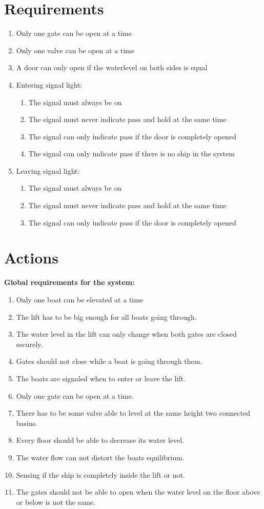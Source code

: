 \documentclass{article}
\begin{document}
\section{Requirements}
\begin{enumerate}
	\item Only one gate can be open at a time
	\item Only one valve can be open at a time
	\item A door can only open if the waterlevel on both sides is equal
	\item Entering signal light:
		\begin{enumerate}
			\item The signal must always be on
			\item The signal must never indicate pass and hold at the same time
			\item The signal can only indicate pass if the door is completely opened
			\item The signal can only indicate pass if there is no ship in the system
		\end{enumerate}
	\item Leaving signal light:
		\begin{enumerate}
			\item The signal must always be on
			\item The signal must never indicate pass and hold at the same time
			\item The signal can only indicate pass if the door is completely opened
		\end{enumerate}
\end{enumerate}

\section{Actions}


\textbf{Global requirements for the system:}
\begin{enumerate}
	\item Only one boat can be elevated at a time
	\item The lift has to be big enough for all boats going through.
	\item The water level in the lift can only change when both gates are closed securely.
	\item Gates should not close while a boat is going through them.
	\item The boats are signaled when to enter or leave the lift.
	\item Only one gate can be open at a time.
	\item There has to be some valve able to level at the same height two connected basins.
	\item Every floor should be able to decrease its water level.
	\item The water flow can not distort the boats equilibrium.
	\item Sensing if the ship is completely inside the lift or not.
	\item The gates should not be able to open when the water level on the floor above or below is not the same.
	
\end{enumerate}
\end{document}
